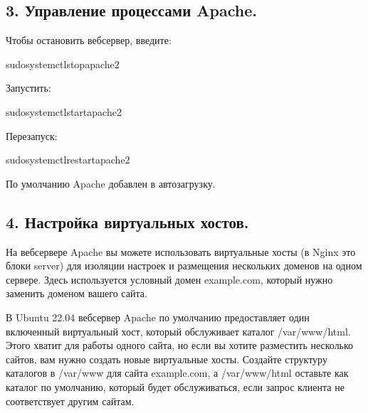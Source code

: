 \documentclass[a4paper,10pt,russian]{report}
\begin{document}
\subsection{3. Управление процессами Apache.}
\label{\detokenize{docs:id5}}
\sphinxAtStartPar
Чтобы остановить веб\sphinxhyphen{}сервер, введите:

\begin{sphinxVerbatim}[commandchars=\\\{\}]
\PYGZdl{}sudosystemctlstopapache2
\end{sphinxVerbatim}

\sphinxAtStartPar
Запустить:

\begin{sphinxVerbatim}[commandchars=\\\{\}]
\PYGZdl{}sudosystemctlstartapache2
\end{sphinxVerbatim}

\sphinxAtStartPar
Перезапуск:

\begin{sphinxVerbatim}[commandchars=\\\{\}]
\PYGZdl{}sudosystemctlrestartapache2
\end{sphinxVerbatim}

\sphinxAtStartPar
По умолчанию Apache добавлен в автозагрузку.


\subsection{4. Настройка виртуальных хостов.}
\label{\detokenize{docs:id6}}
\sphinxAtStartPar
На веб\sphinxhyphen{}сервере Apache вы можете использовать виртуальные хосты (в Nginx это блоки server) для изоляции настроек и
размещения нескольких доменов на одном сервере. Здесь используется условный домен example.com, который нужно заменить доменом вашего сайта.

\sphinxAtStartPar
В Ubuntu 22.04 веб\sphinxhyphen{}сервер Apache по умолчанию предоставляет один включенный виртуальный хост,
который обслуживает каталог /var/www/html. Этого хватит для работы одного сайта, но если вы хотите
разместить несколько сайтов, вам нужно создать новые виртуальные хосты. Создайте структуру каталогов
в /var/www для сайта example.com, а /var/www/html оставьте как каталог по умолчанию, который будет
обслуживаться, если запрос клиента не соответствует другим сайтам.
\end{document}

